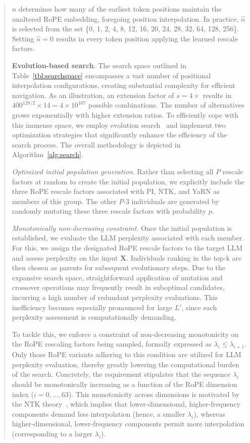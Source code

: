 \begin{abstract}
$\hat{n}$ determines how many of the earliest token positions maintain the unaltered RoPE embedding, foregoing position interpolation. In practice, $\hat{n}$ is selected from the set \{0, 1, 2, 4, 8, 12, 16, 20, 24, 28, 32, 64, 128, 256\}. Setting $\hat{n}=0$ results in every token position applying the learned rescale factors.

\textbf{Evolution-based search}. The search space outlined in Table~\ref{tbl:searchspace} encompasses a vast number of positional interpolation configurations, creating substantial complexity for efficient navigation. As an illustration, an extension factor of $s=4\times$ results in $400^{128/2}\times14 = 4\times10^{167}$ possible combinations. The number of alternatives grows exponentially with higher extension ratios. To efficiently cope with this immense space, we employ evolution search~\cite{guo2020single} and implement two optimization strategies that significantly enhance the efficiency of the search process. The overall methodology is depicted in Algorithm~\ref{alg:search}.

\textit{Optimized initial population generation}. Rather than selecting all $P$ rescale factors at random to create the initial population, we explicitly include the three RoPE rescale factors associated with PI, NTK, and YaRN as members of this group. The other $P$-3 individuals are generated by randomly mutating these three rescale factors with probability $p$.

\textit{Monotonically non-decreasing constraint}. Once the initial population is established, we evaluate the LLM perplexity associated with each member. For this, we assign the designated RoPE rescale factors to the target LLM and assess perplexity on the input $\mathbf{X}$. Individuals ranking in the top-k are then chosen as parents for subsequent evolutionary steps. Due to the expansive search space, straightforward application of mutation and crossover operations may frequently result in suboptimal candidates, incurring a high number of redundant perplexity evaluations. This inefficiency becomes especially pronounced for large $L'$, since each perplexity assessment is computationally demanding.

To tackle this, we enforce a constraint of non-decreasing monotonicity on the RoPE rescaling factors being sampled, formally expressed as $\lambda_i\le \lambda_{i+1}$. Only those RoPE variants adhering to this condition are utilized for LLM perplexity evaluation, thereby greatly lowering the computational burden of the search. Concretely, the requirement stipulates that the sequence $\lambda_i$ should be monotonically increasing as a function of the RoPE dimension index ($i=0,\ldots,63$). This monotonicity across dimensions is motivated by the NTK theory~\cite{jacot2018neural,tancik2020fourier,ntk}, which implies that lower-dimensional, higher-frequency components demand less interpolation (hence, a smaller $\lambda_i$), whereas higher-dimensional, lower-frequency components permit more interpolation (corresponding to a larger $\lambda_i$).


\end{abstract}
